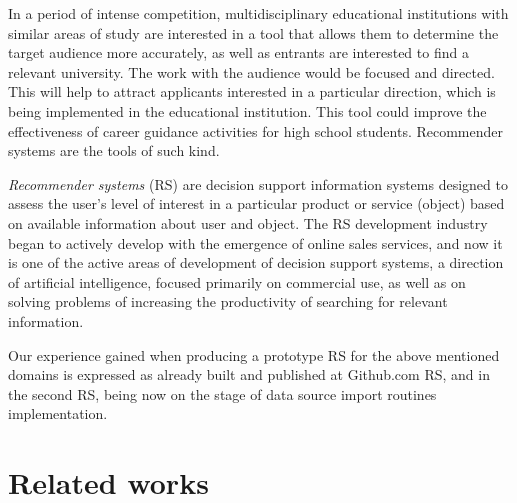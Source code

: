 \documentclass[conference]{IEEEtran}
\begin{document}


In a period of intense competition, multidisciplinary educational institutions with similar areas of study are interested in a tool that allows them to determine the target audience more accurately, as well as entrants are interested to find a relevant university.  The work with the audience would be focused and directed. This will help to attract applicants interested in a particular direction, which is being implemented in the educational institution.  This tool could improve the effectiveness of career guidance activities for high school students.  Recommender systems are the tools of such kind.

\emph{Recommender systems} (RS) \cite{rs_basics} are decision support information systems designed to assess the user's level of interest in a particular product or service (object) based on available information about user and object.  The RS development industry began to actively develop with the emergence of online sales services, and now it is one of the active areas of development of decision support systems, a direction of artificial intelligence, focused primarily on commercial use, as well as on solving problems of increasing the productivity of searching for relevant information.

Our experience gained when producing a prototype RS for the above mentioned domains is expressed as already built and published at Github.com \cite{RSPO} RS, and in the second RS, being now on the stage of data source import routines implementation.

\section{Related works}
\end{document}
